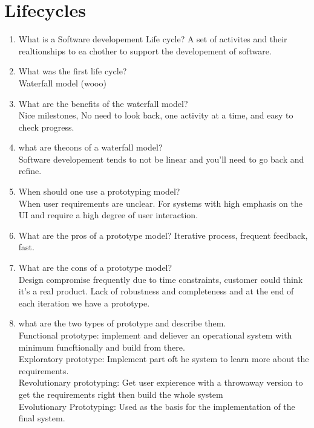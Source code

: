 \documentclass[10pt]{article}
\begin{document}
\section{Lifecycles}
\begin{enumerate}
      \item What is a Software developement Life cycle?
            A set of activites and their realtionships to ea chother to support the developement of software.\\

      \item What was the first life cycle?\\
            Waterfall model (wooo)\\

      \item What are the benefits of the waterfall model?\\
            Nice milestones, No need to look back, one activity at a time, and easy to check progress.\\

      \item what are thecons of a waterfall model?\\
            Software developement tends to not be linear and you'll need to go back and refine.\\

      \item When should one use a prototyping model?\\
            When user requirements are unclear. For systems with high emphasis on the UI and require a high degree of user interaction.\\

      \item What are the pros of a prototype model?
            Iterative process, frequent feedback, fast.\\

      \item What are the cons of a prototype model?\\
            Design compromise frequently due to time constraints, customer could think it's a real product. Lack of robustness and completeness and at the end of each iteration we have a prototype.\\

      \item what are the two types of prototype and describe them.\\
            Functional prototype: implement and deliever an operational system with minimum funcftionally and build from there.\\
            Exploratory prototype: Implement part oft he system to learn more about the requirements.\\
            Revolutionary prototyping: Get user expierence with a throwaway version to get the requirements right then build the whole system\\
            Evolutionary Prototyping: Used as the basis for the implementation of the final system.\\


\end{enumerate}
\end{document}
